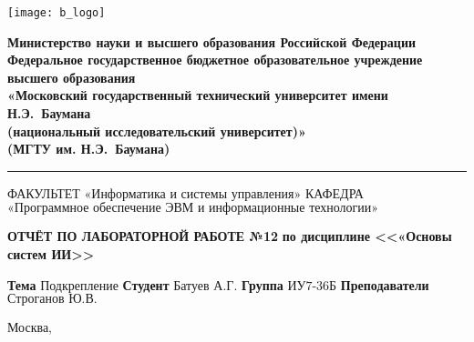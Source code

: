 \thispagestyle{empty}

\noindent \begin{minipage}{0.15\textwidth}
	\texttt{[image: b\_logo]}
\end{minipage}
\noindent\begin{minipage}{0.85\textwidth}\centering
	\textbf{Министерство науки и высшего образования Российской Федерации}\\
	\textbf{Федеральное государственное бюджетное образовательное учреждение высшего образования}\\
	\textbf{«Московский государственный технический университет имени Н.Э.~Баумана}\\
	\textbf{(национальный исследовательский университет)»}\\
	\textbf{(МГТУ им. Н.Э.~Баумана)}
\end{minipage}

\noindent\rule{\linewidth}{3pt}
\newline\newline
\noindent ФАКУЛЬТЕТ $\text{«Информатика и системы управления»}$ \newline\newline
\noindent КАФЕДРА $\text{«Программное обеспечение ЭВМ и информационные технологии»}$

\vspace{1cm}

\begin{center}
	\noindent\begin{minipage}{1.3\textwidth}\centering
		\Large\textbf{ОТЧЁТ ПО ЛАБОРАТОРНОЙ РАБОТЕ №12}\newline
		\textbf{по дисциплине <<«Основы систем ИИ>>}\newline\newline
	\end{minipage}
\end{center}

\noindent\textbf{Тема} $\text{Подкрепление}$\newline\newline
\noindent\textbf{Студент} $\text{Батуев А.Г.}$\newline\newline
\noindent\textbf{Группа} $\text{ИУ7-36Б}$\newline\newline
\noindent\textbf{Преподаватели} $\text{Строганов Ю.В.}$\newline

\begin{center}
	\vfill
	Москва,~\the\year
\end{center}
\clearpage
